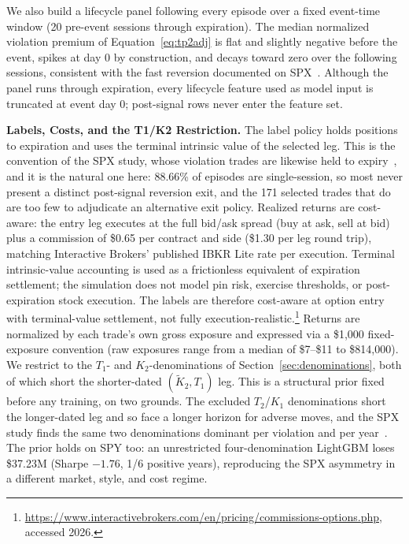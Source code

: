 \documentclass[sigconf,review,anonymous]{acmart}
\begin{document}
We also build a lifecycle panel following every episode over a fixed event-time window (20 pre-event sessions through expiration). The median normalized violation premium of Equation~\eqref{eq:tp2adj} is flat and slightly negative before the event, spikes at day 0 by construction, and decays toward zero over the following sessions, consistent with the fast reversion documented on SPX~\cite{glasserman2025tp2}. Although the panel runs through expiration, every lifecycle feature used as model input is truncated at event day 0; post-signal rows never enter the feature set.

\medskip\noindent\textbf{Labels, Costs, and the T1/K2 Restriction.}
\label{sec:labels}
The label policy holds positions to expiration and uses the terminal intrinsic value of the selected leg. This is the convention of the SPX study, whose violation trades are likewise held to expiry~\cite{glasserman2025tp2}, and it is the natural one here: 88.66\% of episodes are single-session, so most never present a distinct post-signal reversion exit, and the 171 selected trades that do are too few to adjudicate an alternative exit policy.
Realized returns are cost-aware: the entry leg executes at the full bid/ask spread (buy at ask, sell at bid) plus a commission of \$0.65 per contract and side (\$1.30 per leg round trip), matching Interactive Brokers' published IBKR Lite rate per execution. Terminal intrinsic-value accounting is used as a frictionless equivalent of expiration settlement; the simulation does not model pin risk, exercise thresholds, or post-expiration stock execution. The labels are therefore cost-aware at option entry with terminal-value settlement, not fully execution-realistic.\footnote{\url{https://www.interactivebrokers.com/en/pricing/commissions-options.php}, accessed 2026.} Returns are normalized by each trade's own gross exposure and expressed via a \$1{,}000 fixed-exposure convention (raw exposures range from a median of \$7--\$11 to \$814{,}000). We restrict to the $T_1$- and $K_2$-denominations of Section~\ref{sec:denominations}, both of which short the shorter-dated $(\tilde K_2,T_1)$ leg. This is a structural prior fixed before any training, on two grounds. The excluded $T_2$/$K_1$ denominations short the longer-dated leg and so face a longer horizon for adverse moves, and the SPX study finds the same two denominations dominant per violation and per year~\cite{glasserman2025tp2}. The prior holds on SPY too: an unrestricted four-denomination LightGBM loses \$37.23M (Sharpe $-1.76$, 1/6 positive years), reproducing the SPX asymmetry in a different market, style, and cost regime.
\end{document}
